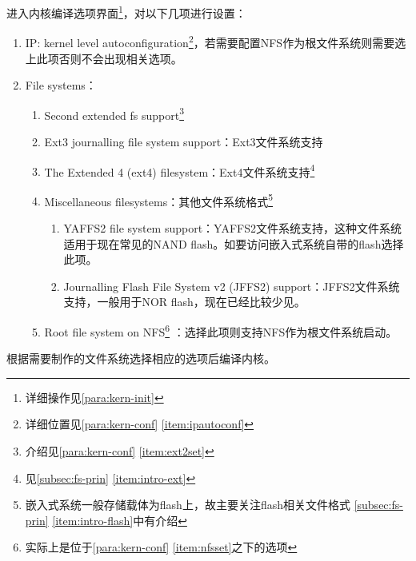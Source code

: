 \documentclass[hyperref,UTF8]{ctexart}
\begin{document}
\label{para:dll-set}

进入内核编译选项界面\footnote{详细操作见\ref{para:kern-init}}，对以下几项进行设置：\label{para:kern-fs-set}
\begin{enumerate}
    \item IP: kernel level autoconfiguration\footnote{详细位置见\ref{para:kern-conf} \ref{item:ipautoconf}}，若需要配置NFS作为根文件系统则需要选上此项否则不会出现相关选项。
    \item File systems：
    \begin{enumerate}
        \item Second extended fs support\footnote{介绍见\ref{para:kern-conf} \ref{item:ext2set}}
        \item Ext3 journalling file system support：Ext3文件系统支持
        \item The Extended 4 (ext4) filesystem：Ext4文件系统支持\footnote{见\ref{subsec:fs-prin} \ref{item:intro-ext}}
        \item Miscellaneous filesystems：其他文件系统格式\footnote{嵌入式系统一般存储载体为flash上，故主要关注flash相关文件格式 \ref{subsec:fs-prin} \ref{item:intro-flash}中有介绍}
        \begin{enumerate}
            \item YAFFS2 file system support：YAFFS2文件系统支持，这种文件系统适用于现在常见的NAND flash。如要访问嵌入式系统自带的flash选择此项。\label{item:supyaffs2}
            \item Journalling Flash File System v2 (JFFS2) support：JFFS2文件系统支持，一般用于NOR flash，现在已经比较少见。
        \end{enumerate}
        \item Root file system on NFS\footnote{实际上是位于\ref{para:kern-conf} \ref{item:nfsset}之下的选项} ：选择此项则支持NFS作为根文件系统启动。
    \end{enumerate}
\end{enumerate}

根据需要制作的文件系统选择相应的选项后编译内核。
\end{document}
